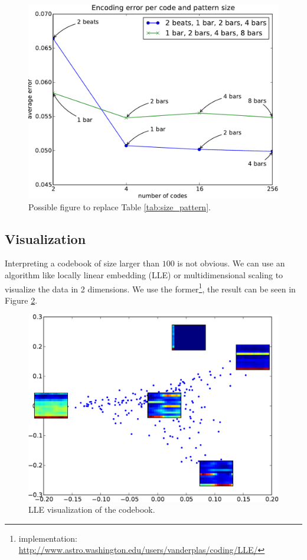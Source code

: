 \documentclass{article}
\begin{document}
\begin{figure}[htb]
\begin{center}
\includegraphics[width=.99\columnwidth]{codesize_patternsize}
\end{center}
\caption{{Possible figure to replace Table \ref{tab:size_pattern}.}}
\label{fig:size_pattern}
\end{figure}


\subsection{Visualization}
Interpreting a codebook of size larger than $100$ is not obvious.
We can use an algorithm like locally linear embedding \cite{Roweis2000} (LLE) 
or multidimensional scaling \cite{Kruskal1964} to visualize the data in
2 dimensions. We use the former\footnote{implementation: 
\url{http://www.astro.washington.edu/users/vanderplas/coding/LLE/}}, the
result can be seen in Figure \ref{fig:lle}.


\begin{figure}[htb]
\begin{center}
\includegraphics[width=.9\columnwidth]{codes_lle}
\end{center}
\caption{{LLE visualization of the codebook.}}
\label{fig:lle}
\end{figure}
\end{document}
